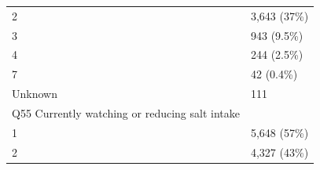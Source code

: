 \documentclass[]{article}
\begin{document}
\begin{longtable}[]{@{}ll@{}}
\begin{minipage}[t]{0.71\columnwidth}
2\strut
\end{minipage} & \begin{minipage}[t]{0.23\columnwidth}\raggedright
3,643 (37\%)\strut
\end{minipage}\tabularnewline
\begin{minipage}[t]{0.71\columnwidth}\raggedright
3\strut
\end{minipage} & \begin{minipage}[t]{0.23\columnwidth}\raggedright
943 (9.5\%)\strut
\end{minipage}\tabularnewline
\begin{minipage}[t]{0.71\columnwidth}\raggedright
4\strut
\end{minipage} & \begin{minipage}[t]{0.23\columnwidth}\raggedright
244 (2.5\%)\strut
\end{minipage}\tabularnewline
\begin{minipage}[t]{0.71\columnwidth}\raggedright
7\strut
\end{minipage} & \begin{minipage}[t]{0.23\columnwidth}\raggedright
42 (0.4\%)\strut
\end{minipage}\tabularnewline
\begin{minipage}[t]{0.71\columnwidth}\raggedright
Unknown\strut
\end{minipage} & \begin{minipage}[t]{0.23\columnwidth}\raggedright
111\strut
\end{minipage}\tabularnewline
\begin{minipage}[t]{0.71\columnwidth}\raggedright
Q55 Currently watching or reducing salt intake\strut
\end{minipage} & \begin{minipage}[t]{0.23\columnwidth}\raggedright
\strut
\end{minipage}\tabularnewline
\begin{minipage}[t]{0.71\columnwidth}\raggedright
1\strut
\end{minipage} & \begin{minipage}[t]{0.23\columnwidth}\raggedright
5,648 (57\%)\strut
\end{minipage}\tabularnewline
\begin{minipage}[t]{0.71\columnwidth}\raggedright
2\strut
\end{minipage} & \begin{minipage}[t]{0.23\columnwidth}\raggedright
4,327 (43\%)\strut
\end{minipage}\tabularnewline

\end{longtable}
\end{document}
